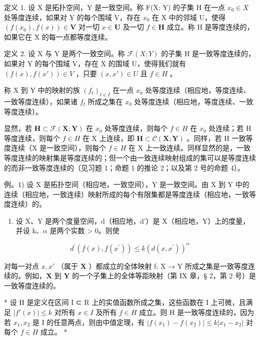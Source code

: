 定义 1. 设 X 是拓扑空间，Y 是一致空间。称 F(X; Y) 的子集 H 在一点 \(x_{0} \in X\) 处等度连续，如果对 Y 的每个围域 V，存在 \(x_{0}\) 在 X 中的邻域 U，使得 \((f(x_{0}),f(x))\in\mathbf{V}\) 对一切 \(x\in\mathbf{U}\) 及一切 \(f\in\mathbf{H}\) 成立。称 H 是等度连续的，如果它在 X 的每一点都等度连续。

定义 2. 设 X 与 Y 是两个一致空间。称 \(\mathcal{F}(X;Y)\) 的子集 H 是一致等度连续的，如果对 Y 的每个围域 V，存在 X 的围域 U，使得我们就有 \((f(x), f(x')) \in V\) ，只要 \((x, x') \in U\) 且 \(f \in H\) 。

称 X 到 Y 中的映射的族 \((f_{t})_{t\in I}\) 在一点 \(x_0\) 处等度连续（相应地，等度连续、一致等度连续），如果诸 \(f_{t}\) 所成之集在 \(x_0\) 处等度连续（相应地，等度连续、一致等度连续）。

显然，若 \(\mathbf{H}\subset\mathcal{F}(\mathbf{X};\mathbf{Y})\) 在 \(x_{0}\) 处等度连续，则每个 \(f\in H\) 在 \(x_{0}\) 处连续；若 H 等度连续，则每个 \(f\in H\) 在 X 上连续，即 \(\mathbf{H}\subset\mathcal{C}(\mathbf{X};\mathbf{Y})\) 。同样，若 H 一致等度连续（X 是一致空间），则每个 \(f\in H\) 在 X 上一致连续。同样显然的是，一致等度连续的映射集是等度连续的；但一个由一致连续映射组成的集可以是等度连续的而非一致等度连续的（见习题 1；命题 1 的推论 2；以及第 2 号的命题 4）。

例。1) 设 X 是拓扑空间（相应地，一致空间），Y 是一致空间。由 X 到 Y 中的连续（相应地，一致连续）映射所成的每个有限集都是等度连续（相应地，一致等度连续）的。

\begin{enumerate}
\def\labelenumi{\arabic{enumi})}
\setcounter{enumi}{1}
\tightlist
\item
  设 X、Y 是两个度量空间，d（相应地，d'）是 X（相应地，Y）上的度量，并设 k、\(\alpha\) 是两个实数 \textgreater{} 0。则使
\end{enumerate}

\[
d ^ {\prime} (f (x), f (x ^ {\prime})) \leqslant k (d (x, x ^ {\prime})) ^ {\alpha}
\]

对每一对点 \(x, x'\) （属于 \(\mathbf{X}\) ）都成立的全体映射 f: X → Y 所成之集是一致等度连续的。例如，\(\mathbf{X}\) 到 \(\mathbf{Y}\) 的一个子集上的全体等距映射（第 IX 章，§ 2，第 2 号）是一致等度连续的。

* 设 H 是定义在区间 I ⊂ R 上的实值函数所成之集，这些函数在 I 上可微，且满足 \(|f'(x)| \leqslant k\) 对所有 \(x \in I\) 及所有 \(f \in H\) 成立。则 H 是一致等度连续的，因为若 \(x_{1}, x_{2}\) 是 I 的任意两点，则由中值定理，有 \(|f(x_{1}) - f(x_{2})| \leqslant k |x_{1} - x_{2}|\) 对每个 \(f \in H\) 成立。 *

